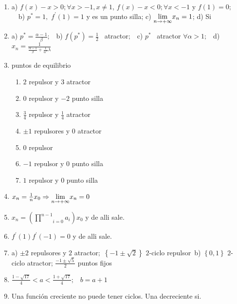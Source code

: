 \documentclass{article}
\begin{document}
\begin{enumerate}
\item a) $f(x)-x>0;\forall x>-1,x\neq 1$, $f(x)-x<0;\forall x<-1$ y $f(1)=0;$%
\ \ b) $p^{\ast }=1,$ $f^{\prime }(1)=1$ y es un punto silla; c) $\underset{%
n\rightarrow +\infty }{\lim }x_{n}=1$; d) Si

\item a) $p^{\ast }=\frac{\alpha -1}{\beta };$ \ b) $f(p^{\ast })=\frac{1}{2}
$ \ atractor$;$ \ c) $p^{\ast }$ \ atractor $\forall \alpha >1;$ \ d) $x_{n}=%
\frac{1}{\frac{\alpha -1}{\beta }+\frac{1}{\alpha ^{n}}\lambda }$

\item puntos de equilibrio

\begin{enumerate}
\item $2$ repulsor y $3$ atractor

\item $0$ repulsor y $-2$ punto silla

\item $\frac{3}{4}$ repulsor y $\frac{1}{4}$ atractor

\item $\pm 1$ repulsores y $0$ atractor

\item $0$ repulsor

\item $-1$ repulsor y $0$ punto silla

\item $1$ repulsor y $0$ punto silla
\end{enumerate}

\item $x_{n}=\frac{1}{n}x_{0}\Rightarrow \underset{n\rightarrow +\infty }{%
\lim }x_{n}=0$

\item $x_{n}=\left( \underset{i=0}{\overset{n-1}{\prod }}a_{i}\right) x_{0}$
y de alli sale.

\item $f^{\prime }(1)f^{\prime }(-1)=0$ y de alli sale.

\item a) $\pm 2$ repulsores y $2$ atractor$;$ $\left\{ -1\pm \sqrt{2}%
\right\} $ $2$-ciclo repulsor\ b) $\left\{ 0,1\right\} $ $2$-ciclo atractor; 
$\frac{-1\pm \sqrt{5}}{2}$ puntos fijos

\item $\frac{1-\sqrt{17}}{4}<a<\frac{1+\sqrt{17}}{4};$ \ $b=a+1$

\item Una funci\'{o}n creciente no puede tener ciclos. Una decreciente si.


\end{enumerate}
\end{document}
